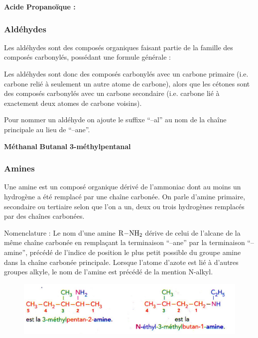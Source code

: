 \documentclass[11pt,a4paper]{article}
\begin{document}
\begin{eg}

\textbf{Acide Propanoïque : }  \quad \quad \quad \quad {}

\end{eg}

\subsubsection*{Aldéhydes}
Les aldéhydes sont des composés organiques faisant partie de la famille des composés carbonylés, possédant une formule générale : 

Les aldéhydes sont donc des composés carbonylés avec un carbone primaire (i.e. carbone relié à seulement un autre atome de carbone), alors que les cétones sont des composés carbonylés avec un carbone secondaire (i.e. carbone lié à exactement deux atomes de carbone voisins). 

Pour nommer un aldéhyde on ajoute le suffixe ``–al'' au nom de la chaîne principale au lieu de ``–ane''. 

\begin{eg}

\textbf{Méthanal} \hspace{3.5cm} \textbf{Butanal} \hspace{3.5cm} \textbf{3-méthylpentanal}
\vspace{3cm}
\end{eg}

\subsubsection*{Amines}
Une amine est un composé organique dérivé de l’ammoniac dont au moins un hydrogène a été remplacé par une chaîne carbonée. On parle d’amine primaire, secondaire ou tertiaire selon que l’on a un, deux ou trois hydrogènes remplacés par des chaînes carbonées.  

Nomenclature : Le nom d’une amine $\ce{R-NH2}$  dérive de celui de l’alcane de la même chaîne carbonée en remplaçant la terminaison ``–ane'' par la terminaison ``–amine'', précédé de l’indice de position le plus petit possible du groupe amine dans la chaîne carbonée principale. Lorsque l’atome d’azote est lié à d’autres groupes alkyle, le nom de l’amine est précédé de la mention N-alkyl.

\begin{figure}[h]
    \centering
    \includegraphics[width=0.85\linewidth]{imgs/c5/exAmine.jpg}
\end{figure}
\end{document}
